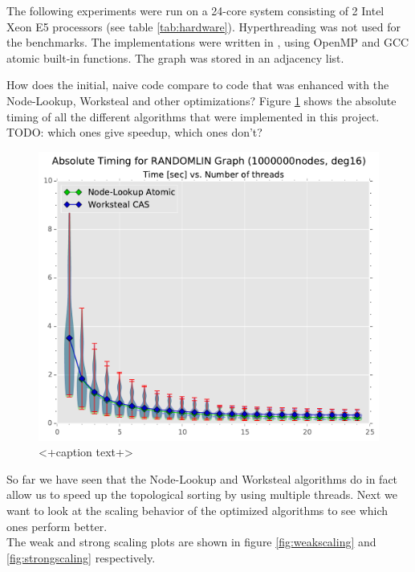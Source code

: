 The following experiments were run on a 24-core system consisting of 2 Intel Xeon E5 processors (see table \ref{tab:hardware}).
Hyperthreading was not used for the benchmarks.
The implementations were written in \Cpp, using OpenMP and GCC atomic built-in functions. The graph was stored in an adjacency list.
\par\medskip



How does the initial, naive code compare to code that was enhanced with the Node-Lookup, Worksteal and other optimizations?
Figure \ref{fig:abstiming} shows the absolute timing of all the different algorithms that were implemented in this project.
{\Large TODO: which ones give speedup, which ones don't?}
%
\begin{figure}[ht]
	\centering
	\includegraphics[width=\columnwidth]{plots/abstiming_gtRANDOMLIN_n1000000_deg16.pdf}
	\caption{<+caption text+>}
	\label{fig:abstiming}
\end{figure}
\par\medskip


So far we have seen that the Node-Lookup and Worksteal algorithms do in fact allow us to speed up the topological sorting by using multiple threads.
Next we want to look at the scaling behavior of the optimized algorithms to see which ones perform better. \\
The weak and strong scaling plots are shown in figure \ref{fig:weakscaling} and \ref{fig:strongscaling} respectively.

